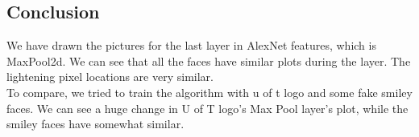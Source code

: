 \documentclass{article}
\begin{document}
\subsection*{Conclusion}
We have drawn the pictures for the last layer in AlexNet features, which is MaxPool2d. We can see that all the faces have similar plots during the layer. The lightening pixel locations are very similar.\\
To compare, we tried to train the algorithm with u of t logo and some fake smiley faces. We can see a huge change in U of T logo's Max Pool layer's plot, while the smiley faces have somewhat similar. 
\end{document}
